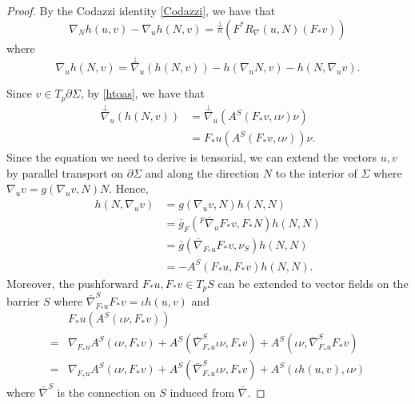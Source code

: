\begin{proof}
    By the Codazzi identity \autoref{Codazzi}, we have that 
    \[\nabla _N h(u,v)-\nabla _u h(N,v)=\overset{\perp }{\pi} (F^*R_{\nabla }(u,N)(F_* v))\]
    where 
    \[\nabla _u h(N,v)=\overset{\perp }{\nabla} _u(h(N,v))-h(\nabla_u N, v)-h(N, \nabla _u v).\]

    Since $v \in T_p \partial \Sigma $, by \autoref{htoas}, we have that
    \begin{equation*}
    \begin{split}
        \overset{\perp }{\nabla} _u(h(N,v)) 
    &=  \overset{\perp }{\nabla} _u(A^S(F_{*}v, \iota \nu ) \nu)\\
    &= F_*u(A^S(F_{*}v, \iota \nu )) \nu.
    \end{split}
    \end{equation*} 
    Since the equation we need to derive is tensorial, we can extend the vectors $u,v$ by parallel transport on $\partial \Sigma $ and along the direction $N$ to the interior of $\Sigma $ where $\nabla _u v=g(\nabla _u v,N) N.$
    Hence,
    \begin{equation*}
    \begin{split}
        h(N, \nabla _u v) 
    &= g(\nabla _u v,N) h(N,N)  \\
    &= \bar{g}_F({}^F \bar{\nabla } _u F_* v , F_*N) h(N,N)  \\
    &= \bar{g}(\bar{\nabla } _{F_*u} F_* v , \nu_S)h(N,N)  \\
    &= -A^S(F_*u, F_* v)h(N,N).
    \end{split}
    \end{equation*}
    Moreover, the pushforward $F_*u, F_* v \in T_pS$ can be extended to vector fields on the barrier $S$ where $\bar{\nabla }^{S}_{F_*u} F_*v=\iota h(u,v)$ and
    \begin{equation*}
    \begin{split}
        &F_*u(A^S(\iota \nu , F_*v)) \\
    =& \nabla _{F_*u}A^S(\iota \nu , F_*v)+A^S(\bar{\nabla }^{S}_{F_*u} \iota \nu , F_*v)+A^S(\iota \nu , \bar{\nabla }^{S}_{F_*u} F_*v)\\
    =& \nabla _{F_*u}A^S(\iota \nu , F_*v)+A^S(\bar{\nabla }^{S}_{F_*u} \iota \nu , F_*v)+A^S(\iota  h(u,v) , \iota \nu )
    \end{split}
    \end{equation*}
    where $\bar{\nabla }^{S}$ is the connection on $S$ induced from $\bar{\nabla }$.


\end{proof}
